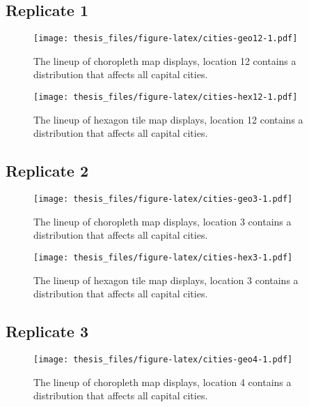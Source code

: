 \documentclass{monashthesis}
\begin{document}
\hypertarget{replicate-1}{%
\subsection{Replicate 1}\label{replicate-1}}

\begin{figure}
\centering
\texttt{[image: thesis\_files/figure-latex/cities-geo12-1.pdf]}
\caption{\label{fig:cities-geo12}The lineup of choropleth map displays, location 12 contains a distribution that affects all capital cities.}
\end{figure}

\begin{figure}
\centering
\texttt{[image: thesis\_files/figure-latex/cities-hex12-1.pdf]}
\caption{\label{fig:cities-hex12}The lineup of hexagon tile map displays, location 12 contains a distribution that affects all capital cities.}
\end{figure}

\hypertarget{replicate-2}{%
\subsection{Replicate 2}\label{replicate-2}}

\begin{figure}
\centering
\texttt{[image: thesis\_files/figure-latex/cities-geo3-1.pdf]}
\caption{\label{fig:cities-geo3}The lineup of choropleth map displays, location 3 contains a distribution that affects all capital cities.}
\end{figure}

\begin{figure}
\centering
\texttt{[image: thesis\_files/figure-latex/cities-hex3-1.pdf]}
\caption{\label{fig:cities-hex3}The lineup of hexagon tile map displays, location 3 contains a distribution that affects all capital cities.}
\end{figure}

\hypertarget{replicate-3}{%
\subsection{Replicate 3}\label{replicate-3}}

\begin{figure}
\centering
\texttt{[image: thesis\_files/figure-latex/cities-geo4-1.pdf]}
\caption{\label{fig:cities-geo4}The lineup of choropleth map displays, location 4 contains a distribution that affects all capital cities.}
\end{figure}
\end{document}
